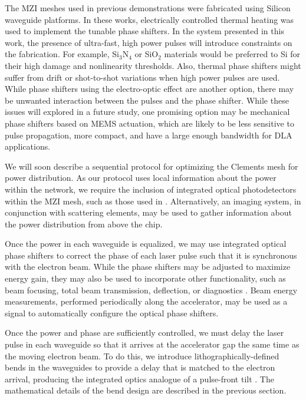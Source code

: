 The MZI meshes used in previous demonstrations \cite{annoni_unscrambling_2017, shen_deep_2017} were fabricated using Silicon waveguide platforms.  In these works, electrically controlled thermal heating was used to implement the tunable phase shifters.  In the system presented in this work, the presence of ultra-fast, high power pulses will introduce constraints on the fabrication.  For example, Si$_3$N$_4$ or SiO$_2$ materials would be preferred to Si for their high damage and nonlinearity thresholds.  Also, thermal phase shifters might suffer from drift or shot-to-shot variations when high power pulses are used.  While phase shifters using the electro-optic effect are another option, there may be unwanted interaction between the pulses and the phase shifter.  While these issues will explored in a future study, one promising option may be mechanical phase shifters \cite{han2015large} based on MEMS actuation, which are likely to be less sensitive to pulse propagation, more compact, and have a large enough bandwidth for DLA applications.

We will soon describe a sequential protocol for optimizing the Clements mesh for power distribution. As our protocol uses local information about the power within the network, we require the inclusion of integrated optical photodetectors within the MZI mesh, such as those used in \cite{annoni_unscrambling_2017}.  Alternatively, an imaging system, in conjunction with scattering elements, may be used to gather information about the power distribution from above the chip.

Once the power in each waveguide is equalized, we may use integrated optical phase shifters to correct the phase of each laser pulse such that it is synchronous with the electron beam. While the phase shifters may be adjusted to maximize energy gain, they may also be used to incorporate other functionality, such as beam focusing, total beam transmission, deflection, or diagnostics \cite{soong2014electron, ye2018deep}.  Beam energy measurements, performed periodically along the accelerator, may be used as a signal to automatically configure the optical phase shifters.

Once the power and phase are sufficiently controlled, we must delay the laser pulse in each waveguide so that it arrives at the accelerator gap the same time as the moving electron beam. To do this, we introduce lithographically-defined bends in the waveguides to provide a delay that is matched to the electron arrival, producing the integrated optics analogue of a pulse-front tilt \cite{cesar_optical_2018}. The mathematical details of the bend design are described in the previous section.

